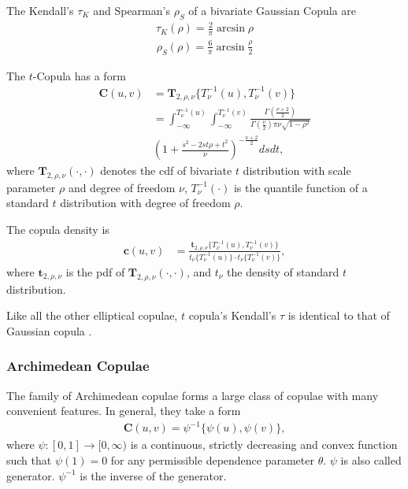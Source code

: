 The Kendall's $\tau_K$ and Spearman's $\rho_S$ of a bivariate Gaussian Copula are
    \begin{align}
        \tau_K(\rho) = \frac{2}{\pi}\arcsin\rho
        \end{align}
    \begin{align}
        \rho_S(\rho) = \frac{6}{\pi}\arcsin\frac{\rho}{2}
        \end{align}\medskip

The $t$-Copula has a form
\begin{align}
        \bm{C}(u,v) &= \bm{T}_{2, \rho, \nu}\{T^{-1}_\nu(u), T^{-1}_\nu(v)\} \nonumber \\
            &= \int_{-\infty}^{T^{-1}_\nu(u)}
               \int_{-\infty}^{T^{-1}_\nu(v)}
            \frac{\Gamma\left(\frac{\nu+2}{2}\right)}
            {\Gamma\left(\frac{\nu}{2}\right)\pi\nu\sqrt{1-\rho^2}}\\
           & \left(
        1+\frac{s^2-2st\rho+t^2}{\nu}
        \right)^{-\frac{\nu+2}{2}} ds dt,
    \end{align}
where $\bm{T}_{2, \rho, \nu}(\cdot, \cdot)$ denotes the cdf of bivariate $t$ distribution with scale parameter $\rho$ and degree of freedom $\nu$,
$T^{-1}_\nu(\cdot)$ is the quantile function of a standard $t$ distribution with degree of freedom $\rho$.

The copula density is
\begin{align}
    \bm{c}(u,v) &= \frac{\bm{t}_{2, \rho, \nu}\{T^{-1}_\nu(u), T^{-1}_\nu(v)\}}
    {t_\nu\{T^{-1}_\nu(u)\}\cdot t_\nu\{T^{-1}_\nu(v)\}},
    \end{align}
where $\bm{t}_{2,\rho, \nu}$ is the pdf of $\bm{T}_{2, \rho, \nu}(\cdot, \cdot)$,
and $t_\nu$ the density of standard $t$ distribution.\medskip

Like all the other elliptical copulae, $t$ copula's Kendall's $\tau$ is identical to that of Gaussian copula \citep[see][and references therein]{demarta2005t}.

\subsubsection{Archimedean Copulae}\label{sec:archimedean-copula}
The family of Archimedean copulae forms a large class of copulae with many convenient features.
In general, they take a form
\begin{align}
    \bm{C}(u,v)= \psi^{-1}\{\psi(u), \psi(v)\},
    \end{align}
where $\psi:[0,1] \rightarrow [0,\infty)$ is a continuous, strictly decreasing and convex function such that
$\psi(1)=0$ for any permissible dependence parameter $\theta$. $\psi$ is also called generator.
$\psi^{-1}$ is the inverse of the generator.\medskip

